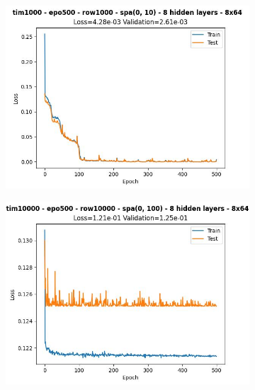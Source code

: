 \begin{figure}[H]
\begin{subfigure}{.47\linewidth}
        \includegraphics[width=\textwidth]{other-models/2024-05-21T23:54:50.147796_pendulum_tim1000_epo500_row1000_spa(0, 10).jpg}
    \end{subfigure}
    \begin{subfigure}{.47\linewidth}
        \centering
        \includegraphics[width=\textwidth]{other-models/2024-05-20T23:02:51.617125_pendulum_tim10000_epo500_row10000_spa(0, 100).jpg}
    \end{subfigure}
\end{figure}
